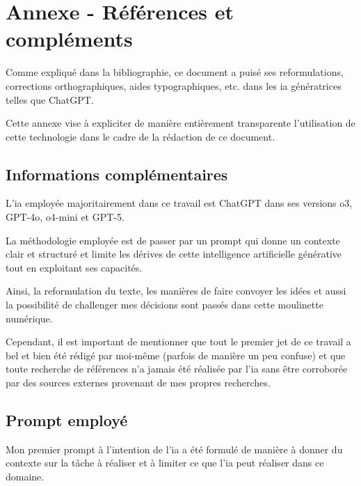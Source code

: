 \section{Annexe - Références et compléments} \label{sec:annexes_d}
Comme expliqué dans la bibliographie, ce document a puisé ses reformulations, corrections orthographiques, aides typographiques, etc. dans les \acrshort{ia} génératrices telles que ChatGPT.

Cette annexe vise à expliciter de manière entièrement transparente l'utilisation de cette technologie dans le cadre de la rédaction de ce document.

\subsection{Informations complémentaires}
L'\acrfull{ia} employée majoritairement dans ce travail est ChatGPT dans ses versions o3, GPT-4o, o4-mini et GPT-5.

La méthodologie employée est de passer par un prompt qui donne un contexte clair et structuré et limite les dérives de cette intelligence artificielle générative tout en exploitant ses capacités.

Ainsi, la reformulation du texte, les manières de faire convoyer les idées et aussi la possibilité de challenger mes décisions sont passés dans cette moulinette numérique.

Cependant, il est important de mentionner que tout le premier jet de ce travail a bel et bien été rédigé par moi-même (parfois de manière un peu confuse) et que toute recherche de références n'a jamais été réalisée par l'\acrshort{ia} sans être corroborée par des sources externes provenant de mes propres recherches.

\subsection{Prompt employé}
Mon premier prompt à l'intention de l'\acrshort{ia} a été formulé de manière à donner du contexte sur la tâche à réaliser et à limiter ce que l'\acrshort{ia} peut réaliser dans ce domaine.

